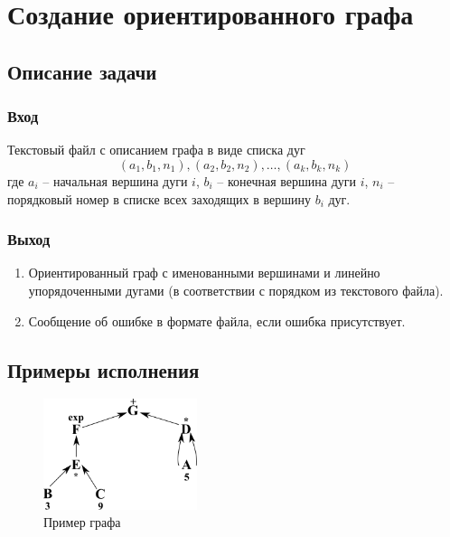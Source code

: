 \documentclass[bachelor, och, pract_otchet]{SCWorks}
\begin{document}



\tableofcontents

\section{Создание ориентированного графа}
\subsection{Описание задачи}
\subsubsection{Вход} 
Текстовый файл с описанием графа в виде списка дуг
\[ (a_1, b_1, n_1), (a_2, b_2, n_2), \dots, (a_k, b_k, n_k) \]
где $a_i$ -- начальная вершина дуги $i$, $b_i$ -- конечная вершина дуги $i$,
$n_i$ -- порядковый номер в списке всех заходящих в вершину $b_i$ дуг.

\subsubsection{Выход}
\begin{enumerate}
  \item Ориентированный граф с именованными вершинами и линейно упорядоченными дугами 
  (в соответствии с порядком из текстового файла).
  \item Сообщение об ошибке в формате файла, если ошибка присутствует.
\end{enumerate}

\subsection{Примеры исполнения}
\begin{figure}[H]
    \centering
    \includegraphics[width=0.4\textwidth]{img/btest1.png}
    \caption{Пример графа}
    \label{1}
\end{figure}
\end{document}
